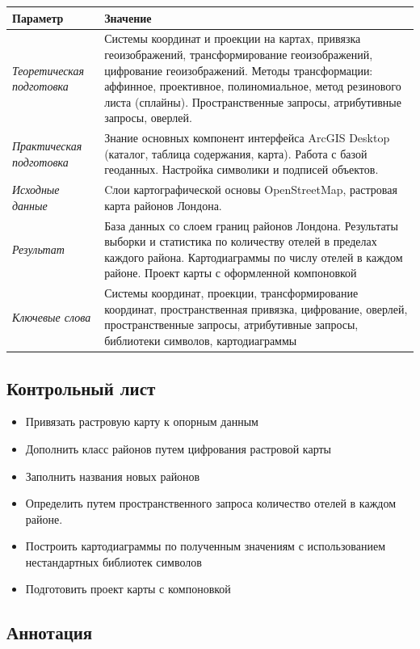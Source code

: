 \documentclass[]{book}
\providecommand{\tightlist}{%
  \setlength{\itemsep}{0pt}\setlength{\parskip}{0pt}}
\theoremstyle{definition}
\theoremstyle{definition}
\theoremstyle{definition}
\theoremstyle{remark}
\begin{document}
\begin{longtable}[]{@{}ll@{}}
\toprule
Параметр & Значение\tabularnewline
\midrule
\endhead
\emph{Теоретическая подготовка} & Системы координат и проекции на
картах, привязка геоизображений, трансформирование геоизображений,
цифрование геоизображений. Методы трансформации: аффинное, проективное,
полиномиальное, метод резинового листа (сплайны). Пространственные
запросы, атрибутивные запросы, оверлей.\tabularnewline
\emph{Практическая подготовка} & Знание основных компонент интерфейса
ArcGIS Desktop (каталог, таблица содержания, карта). Работа с базой
геоданных. Настройка символики и подписей объектов.\tabularnewline
\emph{Исходные данные} & Cлои картографической основы OpenStreetMap,
растровая карта районов Лондона.\tabularnewline
\emph{Результат} & База данных со слоем границ районов Лондона.
Результаты выборки и статистика по количеству отелей в пределах каждого
района. Картодиаграммы по числу отелей в каждом районе. Проект карты с
оформленной компоновкой\tabularnewline
\emph{Ключевые слова} & Системы координат, проекции, трансформирование
координат, пространственная привязка, цифрование, оверлей,
пространственные запросы, атрибутивные запросы, библиотеки символов,
картодиаграммы\tabularnewline
\bottomrule
\end{longtable}

\hypertarget{map-ref-economic-control}{%
\subsection{Контрольный лист}\label{map-ref-economic-control}}

\begin{itemize}
\tightlist
\item
  Привязать растровую карту к опорным данным
\item
  Дополнить класс районов путем цифрования растровой карты
\item
  Заполнить названия новых районов
\item
  Определить путем пространственного запроса количество отелей в каждом
  районе.
\item
  Построить картодиаграммы по полученным значениям с использованием
  нестандартных библиотек символов
\item
  Подготовить проект карты с компоновкой
\end{itemize}

\hypertarget{map-ref-economic-annotation}{%
\subsection{Аннотация}\label{map-ref-economic-annotation}}
\end{document}

